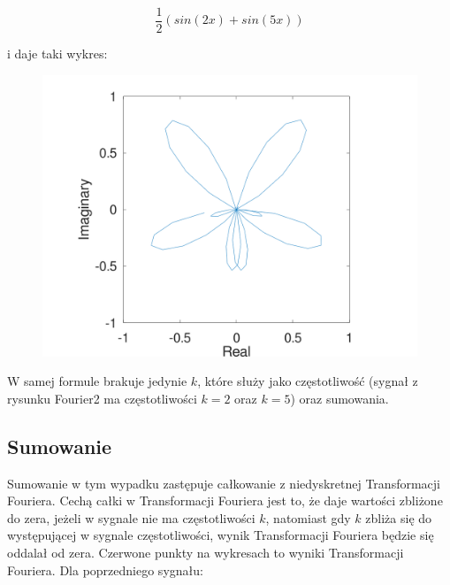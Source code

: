 \documentclass{article}
\begin{document}
\begin{equation}
    \frac{1}{2}(sin(2x) + sin(5x))
\end{equation}

i daje taki wykres:

\begin{figure}
\includegraphics[width=1\textwidth]{fourier2.png}
\caption{}
\end{figure}

W samej formule brakuje jedynie $k$, które służy jako częstotliwość (sygnał z rysunku Fourier2 ma częstotliwości $k=2$ oraz $k=5$) oraz sumowania.

\subsection{Sumowanie}
Sumowanie w tym wypadku zastępuje całkowanie z niedyskretnej Transformacji Fouriera. Cechą całki w Transformacji Fouriera jest to, że daje wartości zbliżone do zera, jeżeli w sygnale nie ma częstotliwości $k$, natomiast gdy $k$ zbliża się do występującej w sygnale częstotliwości, wynik Transformacji Fouriera będzie się oddalał od zera. Czerwone punkty na wykresach to wyniki Transformacji Fouriera. Dla poprzedniego sygnału:
\end{document}

